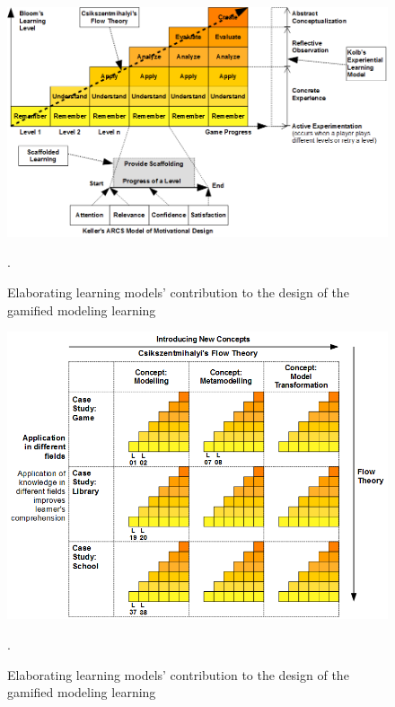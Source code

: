 \documentclass[12pt, a4paper]{report}
\begin{document}
{\begin{figure}[ht]
\centering
\includegraphics[width=\textwidth]{learning-models}
\caption{Elaborating learning models' contribution to the design of the gamified modeling learning}.
\label{learning-models}
\end{figure}

\begin{figure}[ht]
\centering
\includegraphics[width=\textwidth]{learning-models2}
\caption{Elaborating learning models' contribution to the design of the gamified modeling learning}.
\label{learning-models2}
\end{figure}

}
\end{document}
